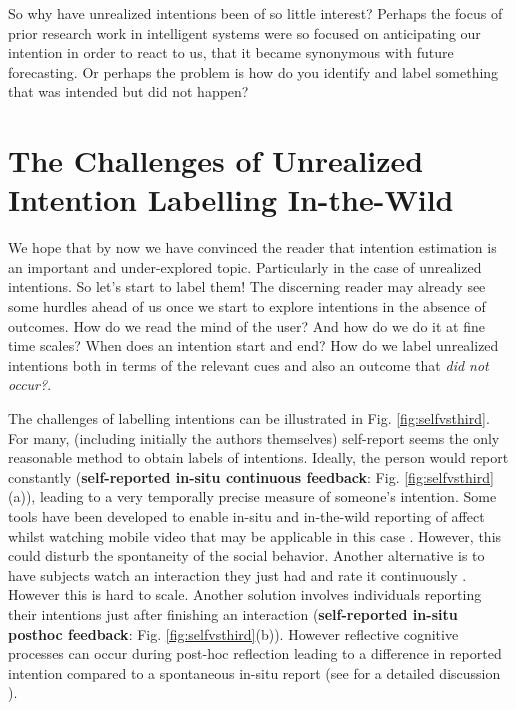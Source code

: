 \documentclass[manuscript,screen,review]{acmart}
\begin{document}
So why have unrealized intentions been of so little interest? Perhaps the focus of prior research work in intelligent systems were so focused on anticipating our intention in order to react to us, that it became synonymous with future forecasting. Or perhaps the problem is how do you identify and label something that was intended but did not happen?



\section{The Challenges of Unrealized Intention Labelling In-the-Wild}
\label{sec:challenge}
We hope that by now we have convinced the reader that intention estimation is an important and under-explored topic. Particularly in the case of unrealized intentions. So let's start to label them! The discerning reader may already see some hurdles ahead of us once we start to explore intentions in the absence of outcomes. How do we read the mind of the user? And how do we do it at fine time scales? When does an intention start and end? How do we label unrealized intentions both in terms of the relevant cues and also an outcome that \emph{did not occur?}. 

The challenges of labelling intentions can be illustrated in Fig. \ref{fig:selfvsthird}. For many, (including initially the authors themselves) self-report seems the only reasonable method to obtain labels of intentions. Ideally, the person would report constantly (\textbf{self-reported in-situ continuous feedback}: Fig. \ref{fig:selfvsthird}(a)), leading to a very temporally precise measure of someone's intention. Some tools have been developed to enable in-situ and in-the-wild reporting of affect whilst watching mobile video that may be applicable in this case \cite{zhang2020rcea}. However, this could disturb the spontaneity of the social behavior. Another alternative is to have subjects watch an interaction they just had and rate it continuously \cite{templeton2023long}. However this is hard to scale. Another solution involves individuals reporting their intentions just after finishing an interaction (\textbf{self-reported in-situ posthoc feedback}: Fig. \ref{fig:selfvsthird}(b)). However reflective cognitive processes can occur during post-hoc reflection leading to a difference in reported intention compared to a spontaneous in-situ report (see \cite{Dudzik2023} for a detailed discussion ). 
 
\end{document}
